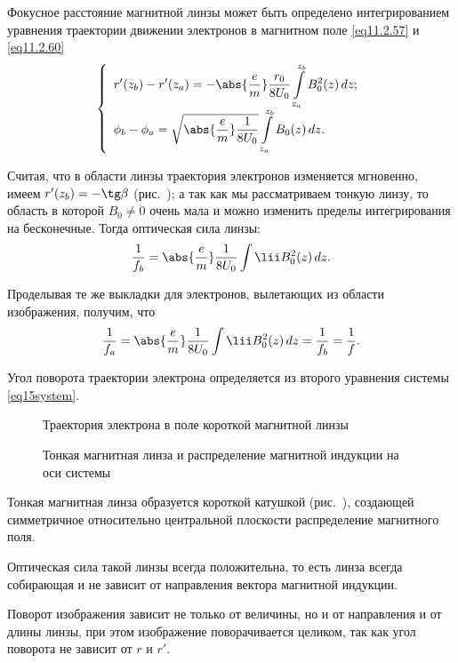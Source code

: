 
Фокусное расстояние магнитной линзы может быть определено интегрированием
уравнения траектории движении электронов в магнитном поле \eqref{eq11.2.57} и
\eqref{eq11.2.60}
\begin{equation}
  \left\{
    \begin{array}{l}
      \displaystyle r'(z_b) - r'(z_a) = -\abs{\frac{e}{m}}\frac{r_0}{8U_0}
        \int\limits_{z_a}^{z_b} B_0^2(z)\,dz; \\
      \displaystyle \phi_b - \phi_a = \sqrt{\abs{\frac{e}{m}}\frac{1}{8U_0}}
        \int\limits_{z_a}^{z_b} B_0(z)\,dz.
    \end{array}
  \right.
  \label{eq15system}
\end{equation}

Считая, что в области линзы траектория электронов изменяется мгновенно, имеем
\( r'(z_b) = -\tg\beta \) (рис.~); а так как мы рассматриваем тонкую
линзу, то область в которой \( B_0 \ne 0 \) очень мала и можно изменить пределы
интегрирования на бесконечные. Тогда оптическая сила линзы:
\[
  \frac{1}{f_b} = \abs{\frac{e}{m}}\frac{1}{8U_0} \int\lii B_0^2(z)\,dz.
\]

Проделывая те же выкладки для электронов, вылетающих из области изображения,
получим, что
\[
  \frac{1}{f_a} = \abs{\frac{e}{m}}\frac{1}{8U_0} \int\lii B_0^2(z)\,dz =
    \frac{1}{f_b} = \frac{1}{f}.
\]

Угол поворота траектории электрона определяется из второго уравнения системы
\eqref{eq15system}.

\begin{figure}[h!]
  \center
  \parbox{.35\textwidth}{\caption{Траектория электрона в поле короткой магнитной
    линзы} \label{pic15path}} \hspace{1em}
  \parbox{.35\textwidth}{\caption{Тонкая магнитная линза и распределение
    магнитной индукции на оси системы} \label{pic15lens}}
\end{figure}

Тонкая магнитная линза образуется короткой катушкой (рис.~),
создающей симметричное относительно центральной плоскости распределение
магнитного поля.

Оптическая сила такой линзы всегда положительна, то есть линза всегда собирающая
и не зависит от направления вектора магнитной индукции.

Поворот изображения зависит не только от величины, но и от направления и от
длины линзы, при этом изображение поворачивается целиком, так как угол поворота
не зависит от \( r \) и \( r' \).
